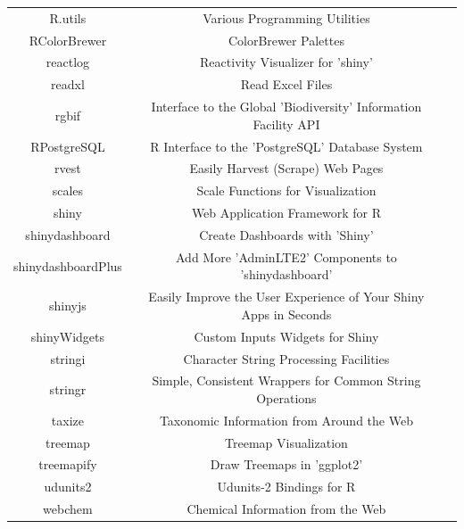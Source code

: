 \documentclass[journal,datadescriptor,accept,moreauthors,pdftex]{Definitions/mdpi}
\begin{document}
\begin{table}[H]
\begin{tabular}{ccc}
R.utils & Various Programming Utilities & \citep{R-R.utils} \\
RColorBrewer & ColorBrewer Palettes & \citep{R-RColorBrewer} \\
reactlog & Reactivity Visualizer for 'shiny' & \citep{R-reactlog} \\
readxl & Read Excel Files & \citep{R-readxl} \\
rgbif & Interface to the Global 'Biodiversity' Information Facility API & \citep{R-rgbif} \\ RPostgreSQL & R Interface to the 'PostgreSQL' Database System & \citep{R-RPostgreSQL} \\
rvest & Easily Harvest (Scrape) Web Pages & \citep{R-rvest} \\
scales & Scale Functions for Visualization & \citep{R-scales} \\
shiny & Web Application Framework for R & \citep{R-shiny} \\
shinydashboard & Create Dashboards with 'Shiny' & \citep{R-shinydashboard} \\
shinydashboardPlus & Add More 'AdminLTE2' Components to 'shinydashboard' & \citep{R-shinydashboardPlus} \\
shinyjs & Easily Improve the User Experience of Your Shiny Apps in Seconds & \citep{R-shinyjs} \\ shinyWidgets & Custom Inputs Widgets for Shiny & \citep{R-shinyWidgets} \\
stringi & Character String Processing Facilities & \citep{R-stringi} \\
stringr & Simple, Consistent Wrappers for Common String Operations & \citep{R-stringr} \\
taxize & Taxonomic Information from Around the Web & \citep{R-taxize} \\
treemap & Treemap Visualization & \citep{R-treemap} \\
treemapify & Draw Treemaps in 'ggplot2' & \citep{R-treemapify} \\
udunits2 & Udunits-2 Bindings for R & \citep{R-udunits2} \\
webchem & Chemical Information from the Web & \citep{R-webchem} \\
\bottomrule
\end{tabular}
\end{table}

\end{document}
